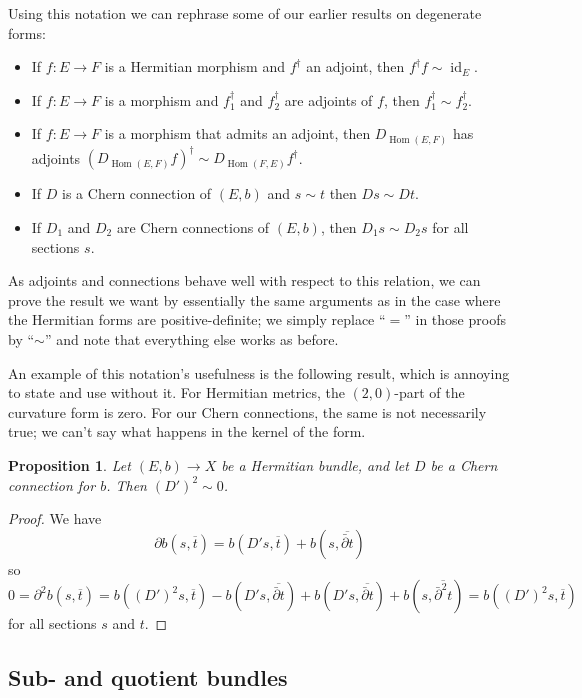 \documentclass[10pt,a4paper]{amsart}
\newtheorem{prop}[theo]{Proposition}
\theoremstyle{definition}
\def\ov#1{\overline{#1}}
\DeclareMathOperator{\Hom}{Hom}
\DeclareMathOperator{\id}{id}
\begin{document}
Using this notation we can rephrase some of our earlier results on degenerate forms:
\begin{itemize}
\item
If $f : E \to F$ is a Hermitian morphism and $f^\dagger$ an adjoint, then $f^\dagger f \sim \id_E$.

\item
If $f : E \to F$ is a morphism and $f_1^\dagger$ and $f_2^\dagger$ are adjoints of $f$, then $f_1^\dagger \sim f_2^\dagger$.

\item
If $f : E \to F$ is a morphism that admits an adjoint, then $D_{\Hom(E,F)}$ has adjoints $(D_{\Hom(E,F)}f)^\dagger \sim D_{\Hom(F,E)}f^\dagger$.

\item
If $D$ is a Chern connection of $(E,b)$ and $s \sim t$ then $Ds \sim Dt$.

\item
If $D_1$ and $D_2$ are Chern connections of $(E,b)$, then $D_1s \sim D_2s$ for all sections $s$.
\end{itemize}
As adjoints and connections behave well with respect to this relation, we can prove the result we want by essentially the same arguments as in the case where the Hermitian forms are positive-definite; we simply replace ``$=$'' in those proofs by ``$\sim$'' and note that everything else works as before.

An example of this notation's usefulness is the following result, which is annoying to state and use without it. For Hermitian metrics, the $(2,0)$-part of the curvature form is zero. For our Chern connections, the same is not necessarily true; we can't say what happens in the kernel of the form.

\begin{prop}
Let $(E, b) \to X$ be a Hermitian bundle, and let $D$ be a Chern connection for $b$. Then $(D')^2 \sim 0$.
\end{prop}

\begin{proof}
We have
\[
\partial b(s, \ov t)
= b(D's, \ov t) + b(s, \ov{\bar\partial t})
\]
so
\[
0 = \partial^2 b(s, \ov t)
= b((D')^2s, \ov t)
- b(D's, \ov{\bar\partial t})
+ b(D's, \ov{\bar\partial t})
+ b(s, \ov{\bar\partial^2 t})
= b((D')^2s, \ov t)
\]
for all sections $s$ and $t$.
\end{proof}




\subsection*{Sub- and quotient bundles}
\end{document}
